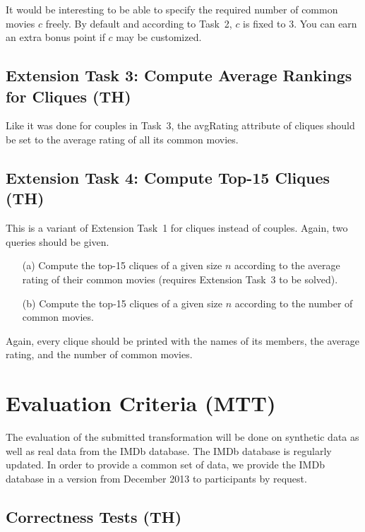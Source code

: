 \documentclass[a4paper,11pt]{article}
\newcommand{\p}[1]{\textsf{\small #1}}
\begin{document}
It would be interesting to be able to specify the required number of common
movies \(c\) freely.  By default and according to Task~2, \(c\) is fixed to 3.
You can earn an extra bonus point if \(c\) may be customized.


\subsection{Extension Task 3: Compute Average Rankings for Cliques (TH)}

Like it was done for couples in Task~3, the \p{avgRating} attribute of
cliques should be set to the average rating of all its common movies.

\subsection{Extension Task 4: Compute Top-15 Cliques (TH)}

This is a variant of Extension Task~1 for cliques instead of couples.  Again,
two queries should be given.

\begin{enumerate}
\item[(a)] Compute the top-15 cliques of a given size \(n\) according to the
  average rating of their common movies (requires Extension Task~3 to be
  solved).
\item[(b)] Compute the top-15 cliques of a given size \(n\) according to the
  number of common movies.
\end{enumerate}

Again, every clique should be printed with the names of its members, the
average rating, and the number of common movies.


\section{Evaluation Criteria (MTT)}\label{sec-eval}

The evaluation of the submitted transformation will be done on
synthetic data as well as real data from the IMDb database. The IMDb
database is regularly updated. In order to provide a common set of
data, we provide the IMDb database in a version from December 2013 to
participants by request. 

\subsection{Correctness Tests (TH)}
\end{document}
